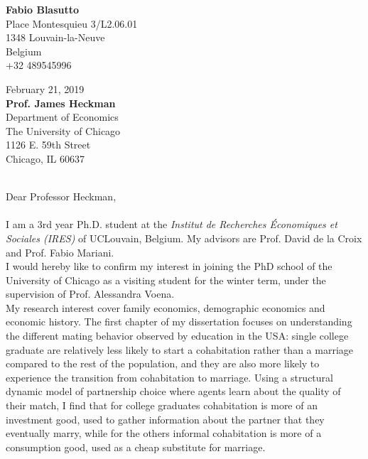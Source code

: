 \documentclass[12pt]{article}
\begin{document}
  {\parbox{\textwidth}{\raggedleft \textbf{Fabio Blasutto}\\ %
 Place Montesquieu 3/L2.06.01\\ %
 1348 Louvain-la-Neuve\\ %
 Belgium \\+32 489545996\\\vspace{0.2cm}}
  {\parbox{1.5\textwidth}{\raggedright February 21, 2019\\\vspace{0.3cm}\textbf{Prof. James Heckman}\\
  Department of Economics\\
The University of Chicago\\
1126 E. 59th Street\\
Chicago, IL 60637}}
\vspace{0.5cm}\\
Dear Professor Heckman,\\
\vspace{0.5cm}\\
I am a 3rd year Ph.D. student at the \textit{Institut de Recherches \'Economiques et Sociales (IRES)} of UCLouvain, Belgium. My advisors are Prof. David de la Croix and Prof. Fabio Mariani.\vspace{0.3cm}\\
I would hereby like to confirm my interest in joining the PhD school of the University of Chicago as a visiting student for the winter term, under the supervision of Prof. Alessandra Voena.\vspace{0.3cm}\\
My research interest cover family economics, demographic economics and economic history. The first chapter of my dissertation focuses on understanding the different mating behavior observed by education in the USA: single college graduate are relatively less likely to start a cohabitation rather than a marriage compared to the rest of the population, and they are also more likely to experience the transition from cohabitation to marriage. Using a structural dynamic model of partnership choice where agents learn about the quality of their match, I find that for college graduates cohabitation is more of an investment good, used to gather information about the partner that they eventually marry, while for the others informal cohabitation is more of a consumption good, used as a cheap substitute for marriage.\vspace{0.3cm}\\
}
\end{document}
